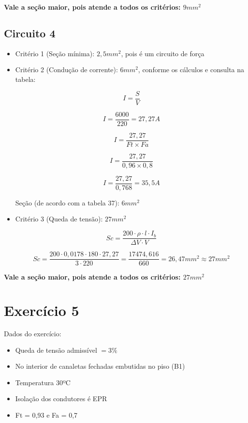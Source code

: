 \documentclass{article}
\begin{document}
\textbf{Vale a seção maior, pois atende a todos os critérios: $9mm^2$}

\subsection{Circuito 4}

\begin{itemize}
\item Critério 1 (Seção mínima): $2,5mm^2$, pois é um circuito de força
\item Critério 2 (Condução de corrente): $6mm^2$, conforme os cálculos e consulta na tabela:

\[I = \frac{S}{V}\]

\[I = \frac{6000}{220} = 27,27 A\]

\[I = \frac{27,27}{Ft\times Fa}\]

\[I = \frac{27,27}{0,96\times 0,8}\]

\[I = \frac{27,27}{0,768} = 35,5 A\]

Seção (de acordo com a tabela 37): $6mm^2$

\item Critério 3 (Queda de tensão): $27mm^2$

\[Sc = \frac{200\cdot \rho\cdot l\cdot I_{b}}{\Delta V\cdot V}\]

\[Sc = \frac{200\cdot 0,0178\cdot 180\cdot 27,27}{3\cdot 220} = \frac{17474,616}{660} = 26,47mm^2 \approx 27mm^2\]
\end{itemize}

\textbf{Vale a seção maior, pois atende a todos os critérios: $27mm^2$}

\section{Exercício 5}
Dados do exercício:
\begin{itemize}
\item Queda de tensão admissível $=3\%$
\item No interior de canaletas fechadas embutidas no piso (B1)
\item Temperatura 30ºC
\item Isolação dos condutores é EPR
\item Ft = 0,93 e Fa = 0,7
\end{itemize}
\end{document}
